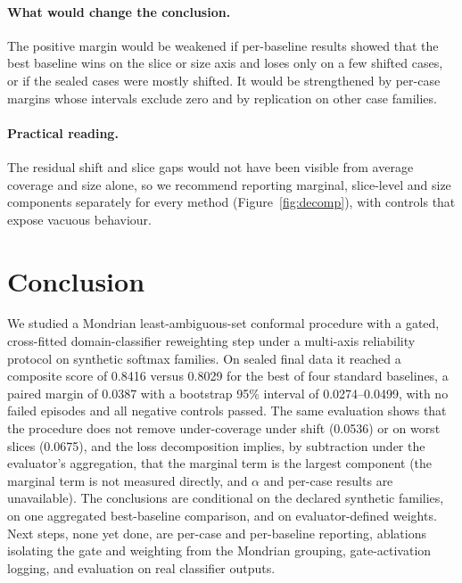 \documentclass{article}
\begin{document}
\paragraph{What would change the conclusion.} The positive margin would be weakened if per-baseline results showed that the best baseline wins on the slice or size axis and loses only on a few shifted cases, or if the sealed cases were mostly shifted. It would be strengthened by per-case margins whose intervals exclude zero and by replication on other case families.

\paragraph{Practical reading.} The residual shift and slice gaps would not have been visible from average coverage and size alone, so we recommend reporting marginal, slice-level and size components separately for every method (Figure~\ref{fig:decomp}), with controls that expose vacuous behaviour.

\section{Conclusion}
We studied a Mondrian least-ambiguous-set conformal procedure with a gated, cross-fitted domain-classifier reweighting step under a multi-axis reliability protocol on synthetic softmax families. On sealed final data it reached a composite score of 0.8416 versus 0.8029 for the best of four standard baselines, a paired margin of 0.0387 with a bootstrap 95\% interval of 0.0274--0.0499, with no failed episodes and all negative controls passed. The same evaluation shows that the procedure does not remove under-coverage under shift (0.0536) or on worst slices (0.0675), and the loss decomposition implies, by subtraction under the evaluator's aggregation, that the marginal term is the largest component (the marginal term is not measured directly, and $\alpha$ and per-case results are unavailable). The conclusions are conditional on the declared synthetic families, on one aggregated best-baseline comparison, and on evaluator-defined weights. Next steps, none yet done, are per-case and per-baseline reporting, ablations isolating the gate and weighting from the Mondrian grouping, gate-activation logging, and evaluation on real classifier outputs.

\clearpage


\end{document}
